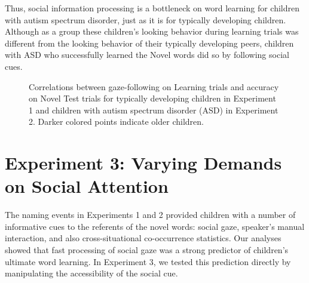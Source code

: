 \documentclass{pnastwo}
\begin{document}
\begin{article}
Thus, social information processing is a bottleneck on word learning for children with autism spectrum disorder, just as it is for typically developing children. Although as a group these children's looking behavior during learning trials was different from the looking behavior of their typically developing peers, children with ASD who successfully learned the Novel words did so by following social cues.

\begin{figure}[tb]
	\caption{\label{fig:corr_plot}Correlations between gaze-following on Learning trials and accuracy on Novel Test trials for typically developing children in Experiment 1 and children with autism spectrum disorder (ASD) in Experiment 2. Darker colored points indicate older children.}

\end{figure}

\section{Experiment 3: Varying Demands on Social Attention}

The naming events in Experiments 1 and 2 provided children with a number of informative cues to the referents of the novel words: social gaze, speaker's manual interaction, and also cross-situational co-occurrence statistics. Our analyses showed that fast processing of social gaze was a strong predictor of children's ultimate word learning. In Experiment 3, we tested this prediction directly by manipulating the accessibility of the social cue.


\end{article}
\end{document}
